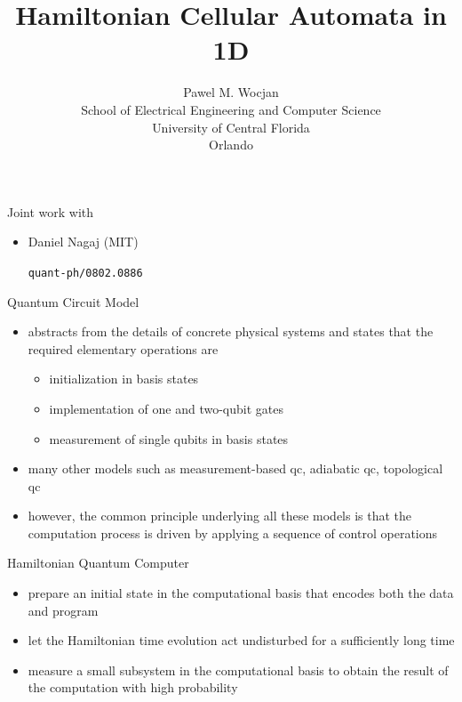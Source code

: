 \documentclass[slideColor]{prosper}
\title{Hamiltonian Cellular Automata in 1D}
\author{Pawel M. Wocjan\\[1ex]School of Electrical Engineering and Computer Science\\ University of Central Florida\\Orlando}
\renewcommand{\>}{\rangle}
\newcommand{\<}{\langle}
\begin{document}
\maketitle


\begin{slide}{Joint work with}
\begin{itemize}
\item Daniel Nagaj (MIT)

\medskip
\texttt{quant-ph/0802.0886}
\end{itemize}
\end{slide}


\begin{slide}{Quantum Circuit Model}
\begin{itemize}
\item abstracts from the details of concrete physical systems and states that the required elementary operations are
\begin{itemize}

\medskip
\item initialization in basis states

\medskip
\item implementation of one and two-qubit gates

\medskip
\item measurement of single qubits in basis states
\end{itemize}

\medskip
\item many other models such as measurement-based qc, adiabatic qc, topological qc

\medskip
\item however, the common principle underlying all these models is that the computation process is driven by applying a sequence of control operations
\end{itemize}
\end{slide}


\begin{slide}{Hamiltonian Quantum Computer}

\begin{itemize}
\item prepare an initial state in the computational basis that encodes both the data and program

\medskip 
\item let the Hamiltonian time evolution act undisturbed for a sufficiently long time 

\medskip
\item measure a small subsystem in the computational basis to obtain the result of the computation with high probability


\end{itemize}
\end{slide}
\end{document}

